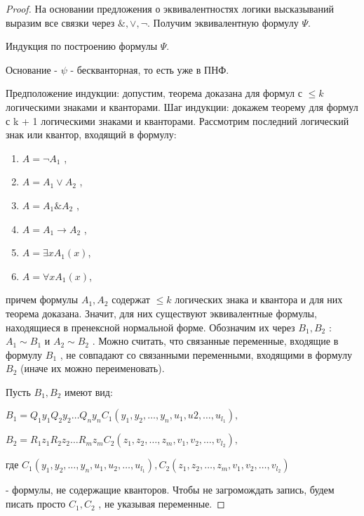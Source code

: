 \documentclass[a4paper]{article}
\theoremstyle{definition}
\theoremstyle{remark}
\begin{document}
    \begin{proof}
        На основании предложения о эквивалентностях логики высказываний 
        выразим все связки через $\&, \vee, \neg$.
        Получим эквивалентную формулу $\Psi$.

        Индукция по построению формулы $\Psi$.

        Основание - $\psi$ - бескванторная, то есть уже в ПНФ.

        Предположение индукции: допустим, теорема доказана для формул с
        $\leq k$ логическими знаками и кванторами.
        Шаг индукции: докажем теорему для формул с k + 1 логическими знаками и кванторами.
        Рассмотрим последний логический знак или квантор, входящий в формулу:
        \begin{enumerate}
            \item$ A = \neg A_1$ ,
            \item $A = A_1 \vee A_2$ ,
            \item $A = A_1 \& A_2$ ,
            \item $A = A_1 \to A_2$ ,
            \item $A = \exists xA_1(x)$,
            \item $A = \forall xA_1(x)$,
        \end{enumerate}
        причем формулы $A_1, A_2$ содержат $\leq k$ логических знака и квантора и для
        них теорема доказана. Значит, для них существуют эквивалентные формулы,
        находящиеся в пренексной нормальной форме. Обозначим их через $B_1, B_2$ :
        $A_1 \sim B_1$ и $A_2 \sim B_2$ . Можно считать, что связанные переменные, 
        входящие в формулу $B_1$ , не совпадают со связанными переменными, входящими
        в формулу $B_2$ (иначе их можно переименовать).

        Пусть $B_1, B_2$ имеют вид:

        $B_1 = Q_1y_1Q_2y_2 \dots Q_ny_nC_1(y_1, y_2, \dots , y_n, u_1, u2, \dots , u_{l_1}),$

        $B_2 = R_1z_1R_2z_2 \dots R_mz_mC_2(z_1, z_2, \dots , z_m, v_1, v_2, \dots , v_{l_2}),$

        где $C_1(y_1, y_2, \dots , y_n, u_1, u_2, \dots , u_{l_1}), C_2(z_1, z_2, \dots , z_m, v_1, v_2, \dots , v_{l_2})$

        - формулы, не содержащие кванторов. Чтобы не загромождать запись, будем писать
        просто $C_1, C_2$ , не указывая переменные.


\end{proof}
\end{document}
